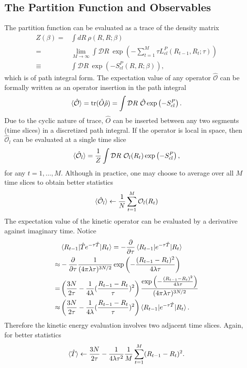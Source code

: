 \documentclass[prl,reprint]{revtex4-1}
\begin{document}
\subsection{The Partition Function and Observables}
The partition function can be evaluated as a trace of the density matrix
\begin{align}
Z(\beta)=& \int dR~\rho(R,R;\beta) \nonumber \\
=&\lim_{M\rightarrow\infty} \int \mathcal{D}R~\exp\left(-\sum_{t=1}^M\tau L_{cl}^P(R_{t-1},R_t;\tau)\right) \nonumber \\
\equiv& \int \mathcal{D}R~\exp\left(-S_{cl}^P(R,R;\beta)\right),
\end{align}
which is of path integral form. The expectation value of any operator $\mathcal{\hat{O}}$ can be formally written as an operator insertion in the path integral
\begin{align}
\braket{\mathcal{\hat{O}}}=\text{tr}(\hat{O}\hat{\rho})=\int \mathcal{D}R~\hat{\mathcal{O}}\exp\left(-S_{cl}^P\right).
\end{align}
Due to the cyclic nature of trace, $\hat{O}$ can be inserted between any two segments (time slices) in a discretized path integral. If the operator is local in space, then $\hat{\mathcal{O}}_l$ can be evaluated at a single time slice
\begin{align}
\braket{\mathcal{\hat{O}}_l}=\frac{1}{Z}\int \mathcal{D}R~\mathcal{O}_l(R_t)\exp\left(-S_{cl}^P\right),
\end{align}
for any $t=1,\dots,M$. Although in practice, one may choose to average over all $M$ time slices to obtain better statistics
\begin{align}
\braket{\mathcal{\hat{O}}_l} \leftarrow \frac{1}{N}\sum_{t=1}^M \mathcal{O}_l(R_{t}) \label{eq:Ol}
\end{align}
 The expectation value of the kinetic operator can be evaluated by a derivative against imaginary time. Notice
\begin{align}
&\braket{R_{t-1}|\hat{T}e^{-\tau\hat{T}}|R_t}=-\frac{\partial}{\partial\tau}\braket{R_{t-1}|e^{-\tau\hat{T}}|R_t}\nonumber \\
\approx&-\frac{\partial}{\partial\tau}\frac{1}{(4\pi\lambda\tau)^{3N/2}}\exp\left(-\frac{(R_{t-1}-R_t)^2}{4\lambda\tau}\right) \nonumber \\
=&\left(\frac{3N}{2\tau}-\frac{1}{4\lambda}(\frac{R_{t-1}-R_t}{\tau})^2\right)\frac{\exp\left(-\frac{(R_{t-1}-R_t)^2}{4\lambda\tau}\right)}{(4\pi\lambda\tau)^{3N/2}} \nonumber \\
\approx& \left(\frac{3N}{2\tau}-\frac{1}{4\lambda}(\frac{R_{t-1}-R_t}{\tau})^2\right)\braket{R_{t-1}|e^{-\tau\hat{T}}|R_t}.
\end{align}
Therefore the kinetic energy evaluation involves two adjacent time slices. Again, for better statistics
\begin{align}
\braket{\hat{T}} \leftarrow \frac{3N}{2\tau}-\frac{1}{4\lambda\tau^2}\frac{1}{M}\sum_{t=1}^M(R_{t-1}-R_t)^2. \label{eq:T}
\end{align}
\end{document}
